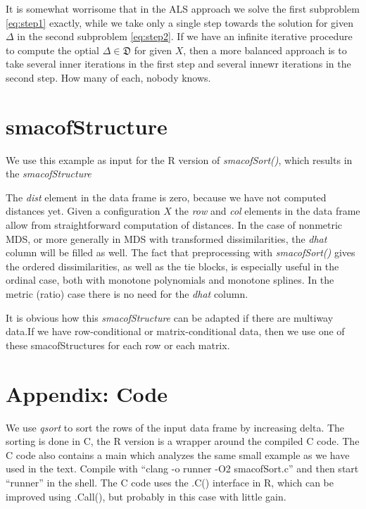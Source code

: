 \documentclass[
  12pt,
]{article}
\begin{document}
It is somewhat worrisome that in the ALS approach we solve the first subproblem \eqref{eq:step1} exactly, while we take only a single step towards the solution for given \(\Delta\) in the second subproblem \eqref{eq:step2}. If we have an
infinite iterative procedure to compute the optial \(\Delta\in\mathfrak{D}\) for given \(X\), then
a more balanced approach is to take several inner iterations in the first step and several
innewr iterations in the second step. How many of each, nobody knows.

\section{smacofStructure}\label{smacofstructure}

We use this example as input for the R version of \emph{smacofSort()}, which results in the
\emph{smacofStructure}

The \emph{dist} element in the data frame is zero, because we have not computed distances yet.
Given a configuration \(X\) the \emph{row} and \emph{col} elements in the data frame allow from
straightforward computation of distances. In the case of nonmetric MDS, or more generally
in MDS with transformed dissimilarities, the \emph{dhat} column will be filled as well.
The fact that preprocessing with \emph{smacofSort()} gives the ordered dissimilarities, as
well as the tie blocks, is especially useful in the ordinal case, both with monotone
polynomials and monotone splines. In the metric (ratio) case there is no need for the
\emph{dhat} column.

It is obvious how this \emph{smacofStructure} can be adapted if there are multiway data.If we have row-conditional or matrix-conditional data, then we use one of these smacofStructures for each
row or each matrix.

\section{Appendix: Code}\label{appendix-code}

We use \emph{qsort} to sort the rows of the input data frame by increasing delta. The sorting
is done in C, the R version is a wrapper around the compiled C code. The C code also
contains a main which analyzes the same small example as we have used in the text.
Compile with ``clang -o runner -O2 smacofSort.c'' and then start ``runner'' in the shell.
The C code uses the .C() interface in R, which can be improved using .Call(),
but probably in this case with little gain.
\end{document}
